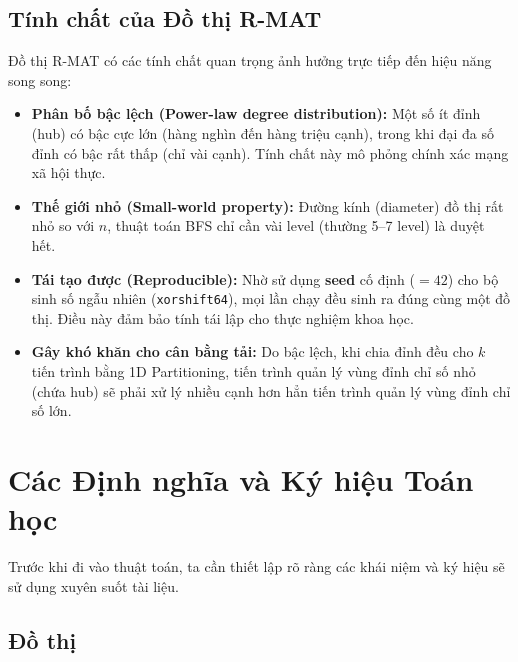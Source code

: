 \documentclass[12pt,a4paper]{article}
\begin{document}
\subsection{Tính chất của Đồ thị R-MAT}

Đồ thị R-MAT có các tính chất quan trọng ảnh hưởng trực tiếp đến hiệu năng song song:

\begin{itemize}
  \item \textbf{Phân bố bậc lệch (Power-law degree distribution):} Một số ít đỉnh (hub) có bậc cực lớn (hàng nghìn đến hàng triệu cạnh), trong khi đại đa số đỉnh có bậc rất thấp (chỉ vài cạnh). Tính chất này mô phỏng chính xác mạng xã hội thực.

  \item \textbf{Thế giới nhỏ (Small-world property):} Đường kính (diameter) đồ thị rất nhỏ so với $n$, thuật toán BFS chỉ cần vài level (thường 5--7 level) là duyệt hết.

  \item \textbf{Tái tạo được (Reproducible):} Nhờ sử dụng \textbf{seed} cố định ($= 42$) cho bộ sinh số ngẫu nhiên (\texttt{xorshift64}), mọi lần chạy đều sinh ra đúng cùng một đồ thị. Điều này đảm bảo tính tái lập cho thực nghiệm khoa học.

  \item \textbf{Gây khó khăn cho cân bằng tải:} Do bậc lệch, khi chia đỉnh đều cho $k$ tiến trình bằng 1D Partitioning, tiến trình quản lý vùng đỉnh chỉ số nhỏ (chứa hub) sẽ phải xử lý nhiều cạnh hơn hẳn tiến trình quản lý vùng đỉnh chỉ số lớn.
\end{itemize}


\section{Các Định nghĩa và Ký hiệu Toán học}
Trước khi đi vào thuật toán, ta cần thiết lập rõ ràng các khái niệm và ký hiệu sẽ sử dụng xuyên suốt tài liệu.

\subsection{Đồ thị}
\end{document}
